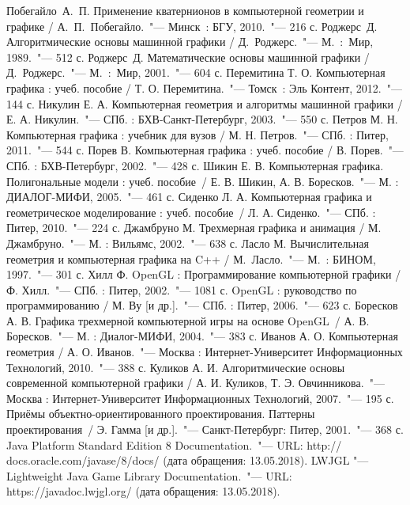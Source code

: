 \renewcommand{\bibname}{Список использованных источников}
\begin{thebibliography}{99}

 Побегайло~А.~П. Применение кватернионов в компьютерной геометрии и графике / А.~П.~Побегайло.~"--- Минск~: БГУ, 2010.~"--- 216 с.
 Роджерс~Д. Алгоритмические основы машинной графики / Д.~Роджерс.~"--- М.~:~Мир, 1989.~"--- 512 с.
 Роджерс~Д. Математические основы машинной графики / Д.~Роджерс.~"--- М.~:~Мир, 2001.~"--- 604 с.
 Перемитина Т. О. Компьютерная графика : учеб. пособие / Т. О. Перемитина.~"--- Томск~: Эль Контент, 2012.~"--- 144 с.
 Никулин Е. А. Компьютерная геометрия и алгоритмы машинной графики / Е. А. Никулин.~"--- СПб. : БХВ-Санкт-Петербург, 2003.~"--- 550 с.
 Петров М. Н. Компьютерная графика : учебник для вузов / М. Н. Петров.~"--- СПб. : Питер, 2011.~"--- 544 с.
 Порев В. Компьютерная графика : учеб. пособие / В. Порев.~"--- СПб. : БХВ-Петербург, 2002.~"--- 428 с.
 Шикин Е. В. Компьютерная графика. Полигональные модели : учеб. пособие~/ Е. В. Шикин, А. В. Боресков.~"--- М. : ДИАЛОГ-МИФИ, 2005.~"--- 461 с.
 Сиденко Л. А. Компьютерная графика и геометрическое моделирование : учеб. пособие~/ Л. А. Сиденко.~"--- СПб. : Питер, 2010.~"--- 224 с.
 Джамбруно М. Трехмерная графика и анимация / М. Джамбруно.~"--- М. : Вильямс, 2002.~"--- 638 с.
 Ласло М. Вычислительная геометрия и компьютерная графика на C++ / М.~Ласло.~"--- М.~: БИНОМ, 1997.~"--- 301 с.
 Хилл Ф. OpenGL : Программирование компьютерной графики / Ф. Хилл.~"--- СПб. : Питер, 2002.~"--- 1081 с.
 OpenGL : руководство по программированию / М. Ву [и др.].~"--- СПб. : Питер, 2006.~"--- 623 с.
 Боресков А. В. Графика трехмерной компьютерной игры на основе OpenGL~/ А. В. Боресков.~"--- М. : Диалог-МИФИ, 2004.~"--- 383 с.
 Иванов А. О. Компьютерная геометрия / А. О. Иванов.~"--- Москва : Интернет-Университет Информационных Технологий, 2010.~"--- 388 с.
 Куликов А. И. Алгоритмические основы современной компьютерной графики / А. И. Куликов, Т. Э. Овчинникова.~"--- Москва : Интернет-Университет Информационных Технологий, 2007.~"--- 195 с.
 Приёмы объектно-ориентированного проектирования. Паттерны проектирования~/ Э. Гамма [и др.].~"---
Санкт-Петербург: Питер, 2001.~"--- 368 с.
 Java Platform Standard Edition 8 Documentation.~"--- URL: http:// docs.oracle.com/javase/8/docs/
(дата обращения: 13.05.2018).
 LWJGL "--- Lightweight Java Game Library Documentation.~"--- URL: https://javadoc.lwjgl.org/
(дата обращения: 13.05.2018).
\end{thebibliography}
